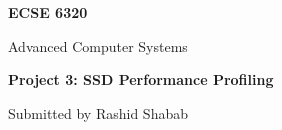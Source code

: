\documentclass[10pt,letterpaper]{article}
\begin{document}
\begin{titlepage}
\thispagestyle{empty}
\centering
\vspace*{1.2in}
{\Large\bfseries ECSE 6320\par}
\vspace{0.3in}
{\Large Advanced Computer Systems\par}
\vspace{0.9in}
{\LARGE\bfseries Project 3: SSD Performance Profiling\par}
\vspace{0.9in}
{\large Submitted by Rashid Shabab\par}
\vfill
\end{titlepage}
\setcounter{page}{2}



\tableofcontents
\clearpage
\end{document}

